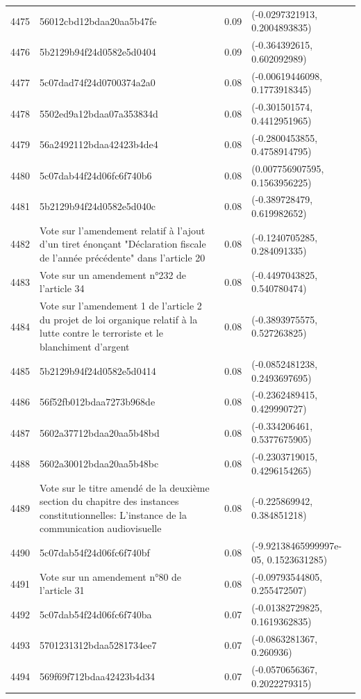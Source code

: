 \begin{table}[ht]
\begin{tabular}{rlrl}
  4475 & 56012cbd12bdaa20aa5b47fe & 0.09 & (-0.0297321913, 0.2004893835) \\ 
  4476 & 5b2129b94f24d0582e5d0404 & 0.09 & (-0.364392615, 0.602092989) \\ 
  4477 & 5c07dad74f24d0700374a2a0 & 0.08 & (-0.00619446098, 0.1773918345) \\ 
  4478 & 5502ed9a12bdaa07a353834d & 0.08 & (-0.301501574, 0.4412951965) \\ 
  4479 & 56a2492112bdaa42423b4de4 & 0.08 & (-0.2800453855, 0.4758914795) \\ 
  4480 & 5c07dab44f24d06fc6f740b6 & 0.08 & (0.007756907595, 0.1563956225) \\ 
  4481 & 5b2129b94f24d0582e5d040c & 0.08 & (-0.389728479, 0.619982652) \\ 
  4482 & Vote sur l'amendement relatif à l'ajout d'un tiret énonçant "Déclaration fiscale de l'année précédente" dans l'article 20 & 0.08 & (-0.1240705285, 0.284091335) \\ 
  4483 & Vote sur un amendement n°232 de l'article 34 & 0.08 & (-0.4497043825, 0.540780474) \\ 
  4484 & Vote sur l'amendement 1 de l'article 2 du projet de loi organique relatif à la lutte contre le terroriste et le blanchiment d'argent & 0.08 & (-0.3893975575, 0.527263825) \\ 
  4485 & 5b2129b94f24d0582e5d0414 & 0.08 & (-0.0852481238, 0.2493697695) \\ 
  4486 & 56f52fb012bdaa7273b968de & 0.08 & (-0.2362489415, 0.429990727) \\ 
  4487 & 5602a37712bdaa20aa5b48bd & 0.08 & (-0.334206461, 0.5377675905) \\ 
  4488 & 5602a30012bdaa20aa5b48bc & 0.08 & (-0.2303719015, 0.4296154265) \\ 
  4489 & Vote sur le titre amendé de la deuxième section du chapitre des instances constitutionnelles: L'instance de la communication audiovisuelle & 0.08 & (-0.225869942, 0.384851218) \\ 
  4490 & 5c07dab54f24d06fc6f740bf & 0.08 & (-9.92138465999997e-05, 0.1523631285) \\ 
  4491 & Vote sur un amendement n°80 de l'article 31 & 0.08 & (-0.09793544805, 0.255472507) \\ 
  4492 & 5c07dab54f24d06fc6f740ba & 0.07 & (-0.01382729825, 0.1619362835) \\ 
  4493 & 5701231312bdaa5281734ee7 & 0.07 & (-0.0863281367, 0.260936) \\ 
  4494 & 569f69f712bdaa42423b4d34 & 0.07 & (-0.0570656367, 0.2022279315) \\ 

\end{tabular}
\end{table}
